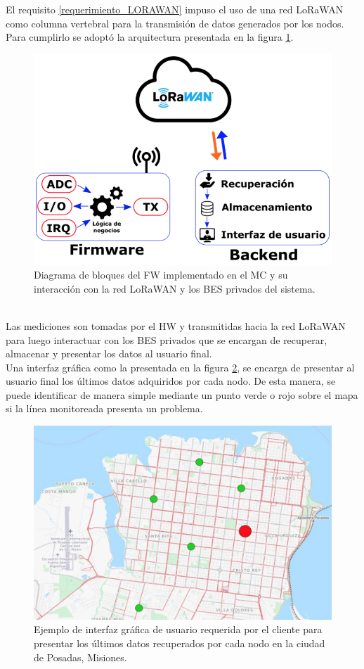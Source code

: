 El requisito \ref{requerimiento_LORAWAN} impuso el uso de una red LoRaWAN como columna vertebral para la transmisión de datos generados por los nodos. Para cumplirlo se adoptó la arquitectura presentada en la figura \ref{fig:diagramadebloquesdebes}.\\
\begin{figure}[h!]
	\centering
	\includegraphics[width=0.6\linewidth]{Figures/diagrama_de_bloques_de_BES}
	\caption{Diagrama de bloques del FW implementado en el MC y su interacción con la red LoRaWAN y los BES privados del sistema.}
	\label{fig:diagramadebloquesdebes}
\end{figure}\\
Las mediciones son tomadas por el HW y transmitidas hacia la red LoRaWAN para luego interactuar con los BES privados que se encargan de recuperar, almacenar y presentar los datos al usuario final.\\
Una interfaz gráfica como la presentada en la figura \ref{fig:guirequeridaporelcliente}, se encarga de presentar al usuario final los últimos datos adquiridos por cada nodo. De esta manera, se puede identificar de manera simple mediante un punto verde o rojo sobre el mapa si la línea monitoreada presenta un problema.
\begin{figure}[h!]
	\centering
	\includegraphics[width=0.7\linewidth]{Figures/GUI_requerida_por_el_cliente}
	\caption{Ejemplo de interfaz gráfica de usuario requerida por el cliente para presentar los últimos datos recuperados por cada nodo en la ciudad de Posadas, Misiones.}
	\label{fig:guirequeridaporelcliente}
\end{figure}

